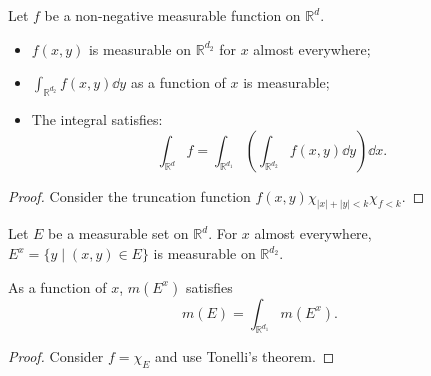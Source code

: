\begin{theorem}
    Let $f$ be a non-negative measurable function on  $\mathbb{R}^{d}$.
	\begin{itemize}
		\item $f(x, y)$ is measurable on $\mathbb{R}^{d_2}$ for $x$ almost everywhere;

		\item  $\int_{\mathbb{R}^{d_2}}f(x,y)\dd y$ as a function of $x$
			is measurable;

		\item The integral satisfies:
			\[
			\int_{\mathbb{R}^{d}} f =\int _{\mathbb{R}^{d_1}}
			\left( \int_{\mathbb{R}^{d_2}} f(x,y)\dd y \right)\dd x.
			\]
	\end{itemize}
\end{theorem}
\begin{proof}[Proof]
    Consider the truncation function $f(x,y)\chi_{|x|+|y|<k}\chi_{f<k}$.
\end{proof}

\begin{proposition}
	Let $E$ be a measurable set on $\mathbb{R}^{d}$. For $x$ almost everywhere,
	$E^x = \{y \mid (x,y)\in E\}$ is measurable on $\mathbb{R}^{d_2}$.

	As a function of $x$,  $m(E^x)$ satisfies
	\[
	m(E) = \int_{\mathbb{R}^{d_1}}m(E^x).
	\]
\end{proposition}
\begin{proof}[Proof]
    Consider $f = \chi_{E}$ and use Tonelli's theorem.
\end{proof}
